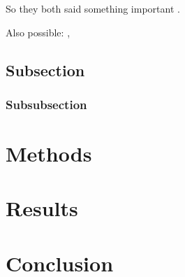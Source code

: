 So they both said something important \cite{dirac,einstein}.

Also possible: \parencite{einstein}, \textcite{dirac}

\subsection{Subsection}
\subsubsection{Subsubsection}



\section{Methods}
\section{Results}
\section{Conclusion}




















\printbibliography







